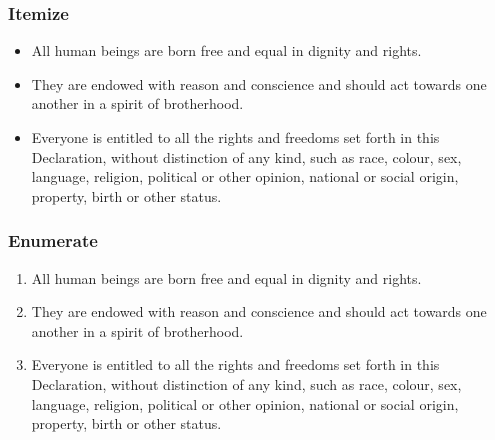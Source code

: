 \documentclass[handout,aspectratio=169]{beamer}
\begin{document}
\begin{frame}
    \frametitle{Itemize}

    \begin{itemize}[<+->]

        \item All human beings are born free and equal in dignity and rights.

        \item They are endowed with reason and conscience and should act
            towards one another in a spirit of brotherhood.

        \item Everyone is entitled to all the rights and freedoms set forth in
            this Declaration, without distinction of any kind, such as race,
            colour, sex, language, religion, political or other opinion,
            national or social origin, property, birth or other status.

    \end{itemize}

\end{frame}


\begin{frame}
    \frametitle{Enumerate}

    \begin{enumerate}[<+->]

        \item All human beings are born free and equal in dignity and rights.

        \item They are endowed with reason and conscience and should act
            towards one another in a spirit of brotherhood.

        \item Everyone is entitled to all the rights and freedoms set forth in
            this Declaration, without distinction of any kind, such as race,
            colour, sex, language, religion, political or other opinion,
            national or social origin, property, birth or other status.

    \end{enumerate}

\end{frame}

\end{document}

